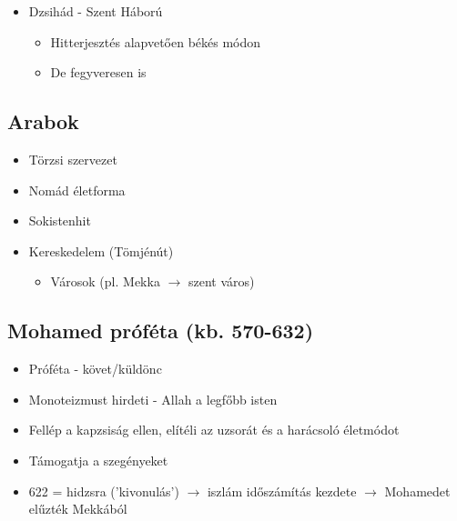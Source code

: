 \documentclass{article}
\begin{document}
\begin{itemize}
\begin{itemize}
        \item alatta kalifa
            \begin{itemize}
                \item Vallási vezető
                \item Állami vezető
                \item Mohamed leszármazottjának tartják
            \end{itemize}
            
        \item defterdár - pénzügyekkel foglalkozik
    \end{itemize}
    
    \item Dzsihád - Szent Háború
    \begin{itemize}
        \item Hitterjesztés alapvetően békés módon
        \item De fegyveresen is
    \end{itemize}
    
\end{itemize}

\subsection{Arabok}

\begin{itemize}
    \item Törzsi szervezet
    \item Nomád életforma
    \item Sokistenhit
    \item Kereskedelem (Tömjénút)
    
    \begin{itemize}
        \item Városok (pl. Mekka $\rightarrow$ szent város)
    \end{itemize}
    
\end{itemize}

\subsection{Mohamed próféta (kb. 570-632)}

\begin{itemize}
    \item Próféta - követ/küldönc
    \item Monoteizmust hirdeti - Allah a legfőbb isten
    \item Fellép a kapzsiság ellen, elítéli az uzsorát és a harácsoló életmódot
    \item Támogatja a szegényeket
    \item 622 = hidzsra ('kivonulás') $\rightarrow$ iszlám időszámítás kezdete $\rightarrow$ Mohamedet elűzték Mekkából
\end{itemize}
\end{document}
